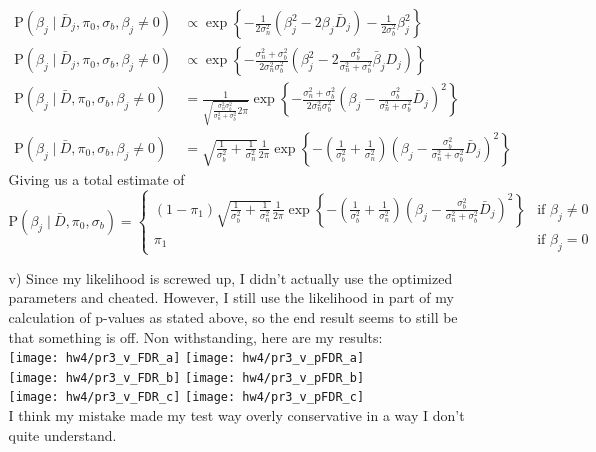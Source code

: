 \documentclass[11pt]{article}
\newcommand{\p}{\mathrm{P}}
\newcommand{\st}{ \; \big | \:}
\theoremstyle{definition}
\begin{document}
\begin{itemize}
\begin{itemize}
\begin{align*}
                    \p(\beta_j\st \bar D_j, \pi_0, \sigma_b, \beta_j\neq 0) &\propto  \exp\left\{-\frac{1}{2\sigma_n^2}\left(\beta_j^2-2\beta_j\bar D_j\right) -\frac{1}{2\sigma_b^2}\beta_j^2\right\} \\
                    \p(\beta_j\st \bar D_j, \pi_0, \sigma_b, \beta_j\neq 0) &\propto  \exp\left\{-\frac{\sigma_n^2+\sigma_b^2}{2\sigma_n^2\sigma_b^2}\left(\beta_j^2-2\frac{\sigma_b^2}{\sigma_n^2+\sigma_b^2}\bar \beta_jD_{j}\right)\right\} \\
                    \p(\beta_j\st \bar D, \pi_0, \sigma_b, \beta_j\neq 0) &= \frac{1}{\sqrt{\frac{\sigma_n^2\sigma_b^2}{\sigma_n^2+\sigma_b^2}2\pi}} \exp\left\{-\frac{\sigma_n^2+\sigma_b^2}{2\sigma_n^2\sigma_b^2}\left(\beta_j-\frac{\sigma_b^2}{\sigma_n^2+\sigma_b^2}\bar D_{j}\right)^2\right\} \\
                    \p(\beta_j\st \bar D, \pi_0, \sigma_b, \beta_j\neq 0) &= \sqrt{\frac{1}{\sigma_b^2}+\frac{1}{\sigma_n^2}} \frac{1}{2\pi} \exp\left\{-\left(\frac{1}{\sigma_b^2}+\frac{1}{\sigma_n^2}\right)\left(\beta_j-\frac{\sigma_b^2}{\sigma_n^2+\sigma_b^2}\bar D_{j}\right)^2\right\}
                \end{align*}
                Giving us a total estimate of 
                \[ \p(\beta_j\st\bar D, \pi_0, \sigma_b) = \begin{cases} 
                        (1-\pi_1)\sqrt{\frac{1}{\sigma_b^2}+\frac{1}{\sigma_n^2}} \frac{1}{2\pi} \exp\left\{-\left(\frac{1}{\sigma_b^2}+\frac{1}{\sigma_n^2}\right)\left(\beta_j-\frac{\sigma_b^2}{\sigma_n^2+\sigma_b^2}\bar D_{j}\right)^2\right\} &\mbox{if } \beta_j\neq 0 \\
                        \pi_1 &\mbox{if } \beta_j=0 \end{cases} \]
            \item[v)] Since my likelihood is screwed up, I didn't actually use the optimized parameters and cheated. However, I still use the likelihood in part of my calculation of p-values as stated above, so the end result seems to still be that something is off. Non withstanding, here are my results: \\
                \texttt{[image: hw4/pr3\_v\_FDR\_a]}
                \texttt{[image: hw4/pr3\_v\_pFDR\_a]} \\
                \texttt{[image: hw4/pr3\_v\_FDR\_b]}
                \texttt{[image: hw4/pr3\_v\_pFDR\_b]} \\
                \texttt{[image: hw4/pr3\_v\_FDR\_c]}
                \texttt{[image: hw4/pr3\_v\_pFDR\_c]} \\
                I think my mistake made my test way overly conservative in a way I don't quite understand.
        \end{itemize}
\end{itemize}
\end{document}
